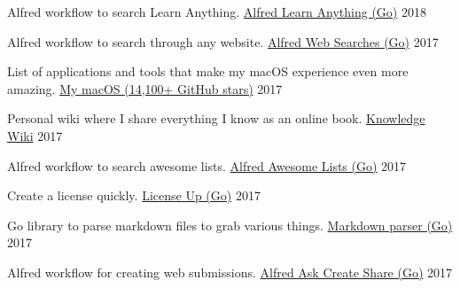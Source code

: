 
\begin{cventries}

  \cventry
    {Alfred workflow to search Learn Anything.}
    {\href{https://github.com/nikitavoloboev/alfred-learn-anything}{Alfred Learn Anything (Go)}}
    {}
    {2018}
    {
    }

    \cventry
    {Alfred workflow to search through any website.}
    {\href{https://github.com/nikitavoloboev/alfred-web-searches}{Alfred Web Searches (Go)}}
    {}
    {2017}
    {
    }

    \cventry
    {List of applications and tools that make my macOS experience even more amazing.}
    {\href{https://github.com/nikitavoloboev/my-mac-os}{My macOS (14,100+ GitHub stars)}}
    {}
    {2017}
    {
    }

    \cventry
    {Personal wiki where I share everything I know as an online book.}
    {\href{https://wiki.nikitavoloboev.xyz}{Knowledge Wiki}}
    {}
    {2017}
    {
    }

    \cventry
    {Alfred workflow to search awesome lists.}
    {\href{https://github.com/nikitavoloboev/alfred-awesome-lists}{Alfred Awesome Lists (Go)}}
    {}
    {2017}
    {
    }

    \cventry
    {Create a license quickly.}
    {\href{https://github.com/nikitavoloboev/license-up}{License Up (Go)}}
    {}
    {2017}
    {
    }

    \cventry
    {Go library to parse markdown files to grab various things.}
    {\href{https://github.com/nikitavoloboev/markdown-parser}{Markdown parser (Go)}}
    {}
    {2017}
    {
    }

    \cventry
    {Alfred workflow for creating web submissions.}
    {\href{https://github.com/nikitavoloboev/alfred-ask-create-share}{Alfred Ask Create Share (Go)}}
    {}
    {2017}
    {
    }

\end{cventries}
